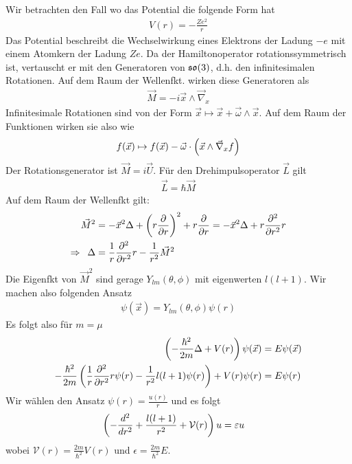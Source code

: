 Wir betrachten den Fall wo das Potential die folgende Form hat
\begin{align*}
    V(r) = - \frac{Z e^2}{r}
\end{align*}
Das Potential beschreibt die Wechselwirkung eines Elektrons der Ladung $-e$ mit
einem Atomkern der Ladung $Ze$. Da der Hamiltonoperator rotationssymmetrisch ist,
vertauscht er mit den Generatoren von $\mathfrak{so}(3)$, d.h. den infinitesimalen Rotationen.
Auf dem Raum der Wellenfkt. wirken diese Generatoren als
\begin{align*}
    \vec{M} = -i \vec{x} \wedge \vec{\nabla}_x
\end{align*}
Infinitesimale Rotationen sind von der Form $\vec{x} \mapsto \vec{x} + \vec{\omega}
\wedge \vec{x}$. Auf dem Raum der Funktionen wirken sie also wie
\begin{align*}
    f(\vec{x}) \mapsto f(\vec{x}) - \vec{\omega} \cdot \left( \vec{x} \wedge \vec{\nabla}_x f \right)
\end{align*}
Der Rotationsgenerator ist $\vec{M} = i \vec{U}$. Für den Drehimpulsoperator $\vec{L}$
gilt
\begin{align*}
    \vec{L} = \hbar \vec{M}
\end{align*}
Auf dem Raum der Wellenfkt gilt:
\begin{align*}
    \vec{M}^2 &= - \vec{x}^2 \Delta + \left( r \frac{\partial}{\partial r} \right)^2 + r \frac{\partial}{\partial r}
    = - \vec{x}^2 \Delta + r \frac{\partial^2}{\partial r^2} r
    \\
    \Rightarrow \hspace{5pt}
    \Delta &= \frac{1}{r} \frac{\partial^2}{\partial r^2} r - \frac{1}{r^2} \vec{M}^2
\end{align*}
Die Eigenfkt von $\vec{M}^2$ sind gerage $Y_{lm}(\theta,\phi)$ mit eigenwerten $l(l+1)$.
Wir machen also folgenden Ansatz
\begin{align*}
    \psi(\vec{x}) = Y_{lm}(\theta,\phi) \psi(r)
\end{align*}
Es folgt also für $m=\mu$
\begin{align*}
    \left( - \frac{\hbar^2}{2 m} \Delta + V(r) \right) \psi(\vec{x}) &= E \psi(\vec{x})
    \\
    - \frac{\hbar^2}{2 m} \left( \frac{1}{r} \frac{\partial^2}{\partial r^2} r \psi(r) - \frac{1}{r^2} l(l+1) \psi(r) \right) + V(r) \psi(r) &= E \psi(r)
\end{align*}
Wir wählen den Ansatz $\psi(r) = \frac{u(r)}{r}$ und es folgt
\begin{align*}
    \left( - \frac{d^2}{d r^2} + \frac{l(l+1)}{r^2} + \mathcal{V} (r) \right) u &= \varepsilon u
\end{align*}
wobei $\mathcal{V}(r) = \frac{2m}{\hbar^2} V(r)$ und $\epsilon = \frac{2m}{\hbar^2} E$.

